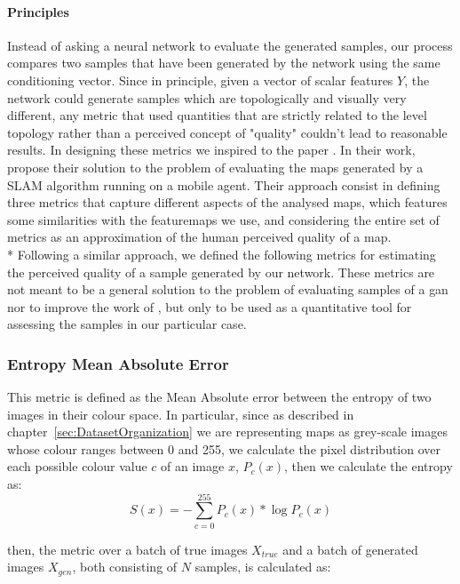 \paragraph{Principles} Instead of asking a neural network to evaluate the generated samples, our process compares two samples that have been generated by the network using the same conditioning vector. Since in principle, given a vector of scalar features $Y$, the network could generate samples which are topologically and visually very different, any metric that used quantities that are strictly related to the level topology rather than a perceived concept of "quality" couldn't lead to reasonable results. In designing these metrics we inspired to the paper . In their work, \citeauthor{slam} propose their solution to the problem of evaluating the maps generated by a SLAM algorithm running on a mobile agent. Their approach consist in defining three metrics that capture different aspects of the analysed maps, which features some similarities with the \glspl{featuremap} we use, and considering the entire set of metrics as an approximation of the human perceived quality of a map. 
\\* Following a similar approach, we defined the following metrics for estimating the perceived quality of a sample generated by our network. These metrics are not meant to be a general solution to the problem of evaluating samples of a \gls{gan} nor to improve the work of \citeauthor{slam_metrics}, but only to be used as a quantitative tool for assessing the samples in our particular case.

\subsubsection{Entropy Mean Absolute Error}
This metric is defined as the Mean Absolute error between the entropy of two images in their colour space. In particular, since as described in chapter~\ref{sec:DatasetOrganization} we are representing maps as grey-scale images whose colour ranges between 0 and 255, we calculate the pixel distribution over each possible colour value $c$ of an image $x$, $P_{c}(x)$, then we calculate the entropy as:
\begin{equation}
	S(x) = - \sum_{c=0}^{255}{ P_{c}(x) * \log{P_{c}(x)} }
\end{equation}

then, the metric over a batch of true images $X_{true}$ and a batch of generated images $X_{gen}$, both consisting of $N$ samples, is calculated as:

